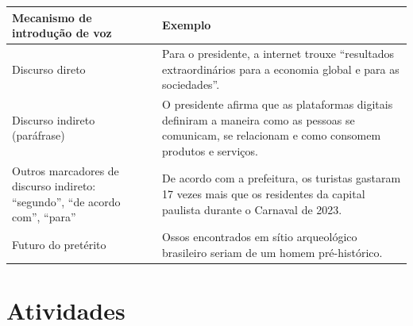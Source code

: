 \begin{longtable}[]{@{}ll@{}}
\toprule
\begin{minipage}[b]{0.46\columnwidth}\raggedright
\textbf{Mecanismo de introdução de voz}\strut
\end{minipage} & \begin{minipage}[b]{0.46\columnwidth}\raggedright
\textbf{Exemplo}\strut
\end{minipage}\tabularnewline
\midrule
\endhead
\begin{minipage}[t]{0.46\columnwidth}\raggedright
Discurso direto\strut
\end{minipage} & \begin{minipage}[t]{0.46\columnwidth}\raggedright
Para o presidente, a internet trouxe ``resultados extraordinários para a
economia global e para as sociedades''.\strut
\end{minipage}\tabularnewline
\begin{minipage}[t]{0.46\columnwidth}\raggedright
Discurso indireto (paráfrase)\strut
\end{minipage} & \begin{minipage}[t]{0.46\columnwidth}\raggedright
O presidente afirma que as plataformas digitais definiram a maneira como
as pessoas se comunicam, se relacionam e como consomem produtos e
serviços.\strut
\end{minipage}\tabularnewline
\begin{minipage}[t]{0.46\columnwidth}\raggedright
Outros marcadores de discurso indireto: ``segundo'', ``de acordo com'',
``para''\strut
\end{minipage} & \begin{minipage}[t]{0.46\columnwidth}\raggedright
De acordo com a prefeitura, os turistas gastaram 17 vezes mais que os
residentes da capital paulista durante o Carnaval de 2023.\strut
\end{minipage}\tabularnewline
\begin{minipage}[t]{0.46\columnwidth}\raggedright
Futuro do pretérito\strut
\end{minipage} & \begin{minipage}[t]{0.46\columnwidth}\raggedright
Ossos encontrados em sítio arqueológico brasileiro seriam de um homem
pré-histórico.\strut
\end{minipage}\tabularnewline
\bottomrule
\end{longtable}

\section{Atividades}


